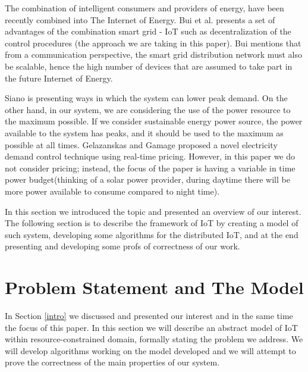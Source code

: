 \documentclass[letterpaper, 10 pt, conference]{ieeeconf}
\begin{document}
The combination of intelligent consumers and providers of energy, have been recently combined into The Internet of Energy. Bui et al. \cite{bui2012internet} presents a set of advantages of the combination smart grid - IoT such as decentralization of the control procedures (the approach we are taking in this paper). Bui mentions that from a communication perspective, the smart grid distribution network must also be scalable, hence the high number of devices that are assumed to take part in the future Internet of Energy.

Siano \cite{siano2014demand} is presenting ways in which the system can lower peak demand. On the other hand, in our system, we are considering the use of the power resource to the maximum possible. If we consider sustainable energy power source, the power available to the system has peaks, and it should be used to the maximum as possible at all times. Gelazanskas and Gamage \cite{gelazanskas2013demand} proposed a novel electricity demand control technique using real-time pricing. However, in this paper we do not consider pricing; instead, the focus of the paper is having a variable in time power budget(thinking of a solar power provider, during daytime there will be more power available to consume compared to night time).

In this section we introduced the topic and presented an overview of our interest. The following section is to describe the framework of IoT by creating a model of such system, developing some algorithms for the distributed IoT, and at the end presenting and developing some profs of correctness of our work.



\section{Problem Statement and The Model}\label{problem}
In Section \ref{intro} we discussed and presented our interest and in the same time the focus of this paper. In this section we will describe an abstract model of IoT within resource-constrained domain, formally stating the problem we address. We will develop algorithms working on the model developed and we will attempt to prove the correctness of the main properties of our system.
\end{document}
